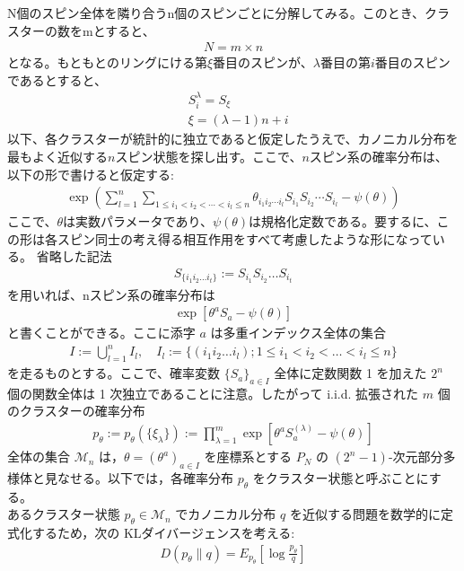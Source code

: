 \documentclass[a4paper,11pt]{jsarticle}
\numberwithin{equation}{section}
\begin{document}
N個のスピン全体を隣り合うn個のスピンごとに分解してみる。このとき、クラスターの数をmとすると、
\begin{align}
    N = m\times n
\end{align}
となる。もともとのリングにける第$\xi$番目のスピンが、$\lambda$番目の第$i$番目のスピンであるとすると、
\begin{align}
    &S_{i}^{\lambda} = S_{\xi}\\
    &\xi = (\lambda -1)n + i
\end{align}
以下、各クラスターが統計的に独立であると仮定したうえで、カノニカル分布を最もよく近似する$n$スピン状態を探し出す。ここで、$n$スピン系の確率分布は、以下の形で書けると仮定する:
\begin{align}
    \exp(\sum_{l=1}^{n} \sum_{1 \leq i_1 < i_2 < \cdots < i_l \leq n} \theta_{i_1 i_2 \cdots i_l} S_{i_1}S_{i_2}\cdots S_{i_l}-\psi(\theta))
\end{align}
ここで、$\theta$は実数パラメータであり、$\psi(\theta)$は規格化定数である。要するに、この形は各スピン同士の考え得る相互作用をすべて考慮したような形になっている。
省略した記法
\begin{align*}
S_{ \{ i_1 i_2 \dots i_t \} } := S_{i_1} S_{i_2} \dots S_{i_t}
\end{align*}
を用いれば、nスピン系の確率分布は
\begin{align}
\exp\left[ \theta^a S_a - \psi(\theta) \right]
\end{align}
と書くことができる。ここに添字 $a$ は多重インデックス全体の集合
\begin{align*}
I := \bigcup_{l=1}^{n} I_l, \quad I_l := \{ (i_1 i_2 \dots i_l); 1 \leq i_1 < i_2 < \dots < i_l \leq n \}
\end{align*}
を走るものとする。ここで、確率変数 $\{ S_a \}_{a \in I}$ 全体に定数関数 1 を加えた $2^n$ 個の関数全体は 1 次独立であることに注意。したがって i.i.d. 拡張された $m$ 個のクラスターの確率分布
\begin{align}
    p_{\theta}:= p_{\theta} (\{ \xi_{\lambda} \}) := \prod_{\lambda=1}^{m} \exp\left[ \theta^a S_a^{(\lambda)} - \psi(\theta) \right]
\end{align}
全体の集合 $\mathcal{M}_n$ は，$\theta = (\theta^a)_{a \in I}$ を座標系とする $P_N$ の $(2^n - 1)$-次元部分多様体と見なせる。以下では，各確率分布 $p_\theta$ をクラスター状態と呼ぶことにする。\\
あるクラスター状態 $p_\theta \in \mathcal{M}_n$ でカノニカル分布 $q$ を近似する問題を数学的に定式化するため，次の KLダイバージェンスを考える:
\begin{align}
D(p_\theta \| q) = E_{p_\theta} \left[ \log \frac{p_\theta}{q} \right]
\end{align}
\end{document}
